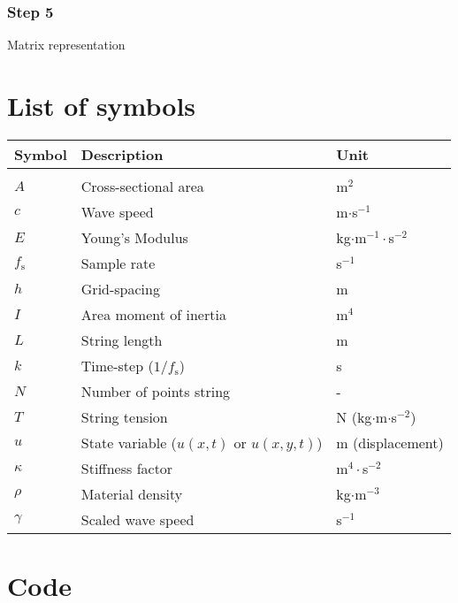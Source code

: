 \documentclass{article}
\begin{document}
\subsubsection*{Step 5}
Matrix representation
\appendix
\section{List of symbols} \label{app:A}
{\renewcommand{\arraystretch}{1.1}
\begin{tabular}{ p{3cm} p{7cm} p{4cm}  }
 Symbol & Description & Unit\\
 \hline\\
 $A$ & Cross-sectional area & m$^2$\\
 $c$ & Wave speed & m$\cdot$s$^{-1}$\\
 $E$ & Young's Modulus & kg$\cdot$m$^{-1}\cdot$s$^{-2}$\\
 $f_\text{s}$ & Sample rate & s$^{-1}$\\
 $h$ & Grid-spacing & m \\ 
 $I$ & Area moment of inertia \cite{Desv2017} & m$^4$\\
 $L$ & String length & m\\
 $k$ & Time-step ($1/f_\text{s}$) & s\\
 $N$ & Number of points string & -\\
 $T$ & String tension & N (kg$\cdot$m$\cdot$s$^{-2}$) \\
 $u$ & State variable ($u(x,t)\text{ or }u(x,y,t)$) & m (displacement)\\ 
 $\kappa$ & Stiffness factor & m$^4\cdot$s$^{-2}$\\
 $\rho$ & Material density & kg$\cdot$m$^{-3}$\\
 $\gamma$ & Scaled wave speed & s$^{-1}$\\
\end{tabular}
}
\section{Code}



\end{document}

